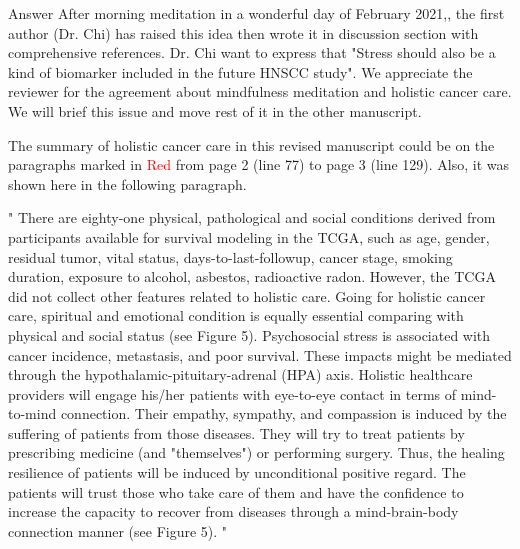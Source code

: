 \documentclass[preprint,12pt]{elsarticle}
\newenvironment{MyColorPar}[1]{%
    \leavevmode\color{#1}\ignorespaces%
}{%
}%
\begin{document}

\begin{MyColorPar}{blue}
Answer
After morning meditation in a wonderful day of February 2021,, the first author (Dr. Chi) has raised this idea then wrote it in discussion section with comprehensive references. Dr. Chi want to express that "Stress should also be a kind of biomarker included in the future HNSCC study".
We appreciate the reviewer for the agreement about mindfulness meditation and holistic cancer care. We will brief this issue and move rest of it in the other manuscript.

The summary of holistic cancer care in this revised manuscript could be on the paragraphs marked in \textcolor{red}{Red} from page 2 (line 77) to page 3 (line 129). Also, it was shown here in the following paragraph.

\begin{MyColorPar}{red}
"%
There are eighty-one physical, pathological and social conditions derived from participants available for survival modeling in the TCGA, %
such as age, gender, residual tumor, vital status, days-to-last-followup, cancer stage, smoking duration, exposure to alcohol, asbestos, radioactive radon. 
However, the TCGA did not collect other features related to holistic care.
Going for holistic cancer care\cite{Mehta2019}\cite{Iftikhar2021}, spiritual and emotional condition is equally essential comparing with physical and social status (see Figure 5).%
Psychosocial stress is associated with cancer incidence\cite{Lutgendorf2010}\cite{Powell2013}\cite{Iftikhar2021}, metastasis\cite{Lutgendorf2010}\cite{Moreno-Smith2010}\cite{Du2020}\cite{Xu2021}, and poor survival\cite{Chida2008}.
These impacts might be mediated through the hypothalamic-pituitary-adrenal (HPA) axis\cite{Hsiao2012}.
Holistic healthcare providers will engage his/her patients with eye-to-eye contact in terms of mind-to-mind connection. Their empathy, sympathy, and compassion is induced by the suffering of patients from those diseases. They will try to treat patients by prescribing medicine (and "themselves") or performing surgery.
Thus, the healing resilience of patients will be induced by unconditional positive regard. %
The patients will trust those who take care of them and have the confidence to increase the capacity to recover from diseases through a mind-brain-body connection manner (see Figure 5).%
"


\end{MyColorPar}
\end{MyColorPar}
\end{document}
